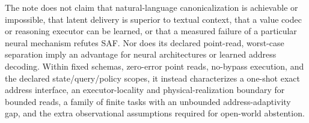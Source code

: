 \documentclass[11pt]{article}
\theoremstyle{definition}
\theoremstyle{plain}
\begin{document}
The note does not claim that natural-language canonicalization is achievable
or impossible, that latent delivery is superior to textual context, that a
value codec or reasoning executor can be learned, or that a measured failure
of a particular neural mechanism refutes SAF.  Nor does its declared
point-read, worst-case separation imply an advantage for neural architectures
or learned address decoding.  Within fixed schemas, zero-error point reads,
no-bypass execution, and the declared state/query/policy scopes, it instead
characterizes a one-shot exact address interface, an executor-locality and
physical-realization boundary for bounded reads, a family of finite tasks
with an unbounded address-adaptivity gap, and the extra observational
assumptions required for open-world abstention.



\end{document}
